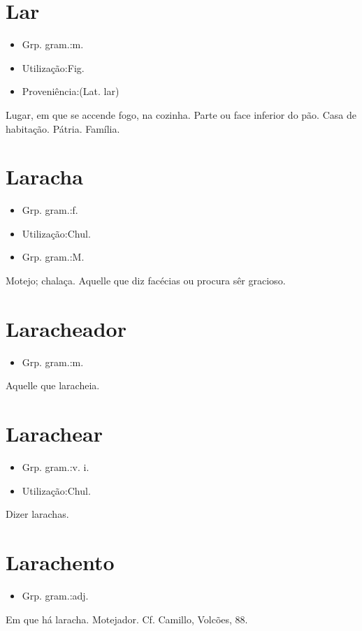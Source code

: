 \section{Lar}
\begin{itemize}
\item {Grp. gram.:m.}
\end{itemize}
\begin{itemize}
\item {Utilização:Fig.}
\end{itemize}
\begin{itemize}
\item {Proveniência:(Lat. \textunderscore lar\textunderscore )}
\end{itemize}
Lugar, em que se accende fogo, na cozinha.
Parte ou face inferior do pão.
Casa de habitação.
Pátria.
Família.
\section{Laracha}
\begin{itemize}
\item {Grp. gram.:f.}
\end{itemize}
\begin{itemize}
\item {Utilização:Chul.}
\end{itemize}
\begin{itemize}
\item {Grp. gram.:M.}
\end{itemize}
Motejo; chalaça.
Aquelle que diz facécias ou procura sêr gracioso.
\section{Laracheador}
\begin{itemize}
\item {Grp. gram.:m.}
\end{itemize}
Aquelle que laracheia.
\section{Larachear}
\begin{itemize}
\item {Grp. gram.:v. i.}
\end{itemize}
\begin{itemize}
\item {Utilização:Chul.}
\end{itemize}
Dizer larachas.
\section{Larachento}
\begin{itemize}
\item {Grp. gram.:adj.}
\end{itemize}
Em que há laracha.
Motejador. Cf. Camillo, \textunderscore Volcões\textunderscore , 88.
